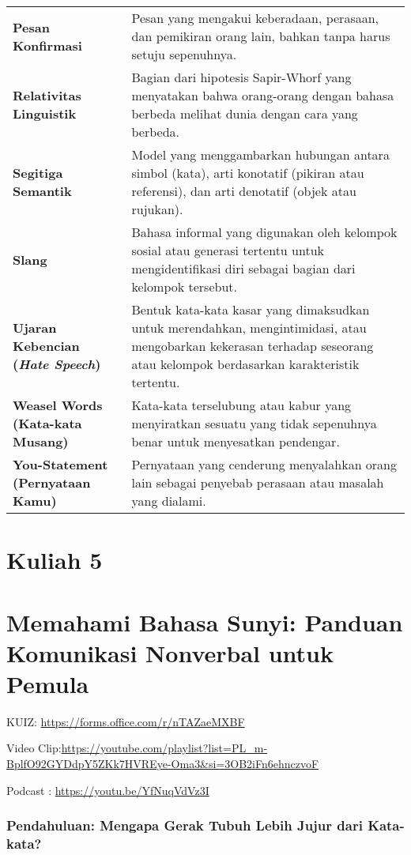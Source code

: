 \documentclass[
  letterpaper,
  DIV=11,
  numbers=noendperiod]{scrreprt}
\begin{document}
\begin{longtable}[]{@{}
  >{\raggedright\arraybackslash}p{}
  >{\raggedright\arraybackslash}p{}@{}}
\textbf{Pesan Konfirmasi} & Pesan yang mengakui keberadaan, perasaan,
dan pemikiran orang lain, bahkan tanpa harus setuju sepenuhnya. \\
\textbf{Relativitas Linguistik} & Bagian dari hipotesis Sapir-Whorf yang
menyatakan bahwa orang-orang dengan bahasa berbeda melihat dunia dengan
cara yang berbeda. \\
\textbf{Segitiga Semantik} & Model yang menggambarkan hubungan antara
simbol (kata), arti konotatif (pikiran atau referensi), dan arti
denotatif (objek atau rujukan). \\
\textbf{Slang} & Bahasa informal yang digunakan oleh kelompok sosial
atau generasi tertentu untuk mengidentifikasi diri sebagai bagian dari
kelompok tersebut. \\
\textbf{Ujaran Kebencian (\emph{Hate Speech})} & Bentuk kata-kata kasar
yang dimaksudkan untuk merendahkan, mengintimidasi, atau mengobarkan
kekerasan terhadap seseorang atau kelompok berdasarkan karakteristik
tertentu. \\
\textbf{Weasel Words (Kata-kata Musang)} & Kata-kata terselubung atau
kabur yang menyiratkan sesuatu yang tidak sepenuhnya benar untuk
menyesatkan pendengar. \\
\textbf{You-Statement (Pernyataan Kamu)} & Pernyataan yang cenderung
menyalahkan orang lain sebagai penyebab perasaan atau masalah yang
dialami. \\
\end{longtable}


\chapter{Kuliah 5}\label{kuliah-5}


\chapter{Memahami Bahasa Sunyi: Panduan Komunikasi Nonverbal untuk
Pemula}\label{memahami-bahasa-sunyi-panduan-komunikasi-nonverbal-untuk-pemula}

KUIZ: \url{https://forms.office.com/r/nTAZaeMXBF}

Video
Clip:\url{https://youtube.com/playlist?list=PL_m-BplfO92GYDdpY5ZKk7HVREye-Oma3&si=3OB2iFn6ehnczvoF}

Podcast : \url{https://youtu.be/YfNuqVdVz3I}

\subsection{Pendahuluan: Mengapa Gerak Tubuh Lebih Jujur dari
Kata-kata?}\label{pendahuluan-mengapa-gerak-tubuh-lebih-jujur-dari-kata-kata}
\end{document}
